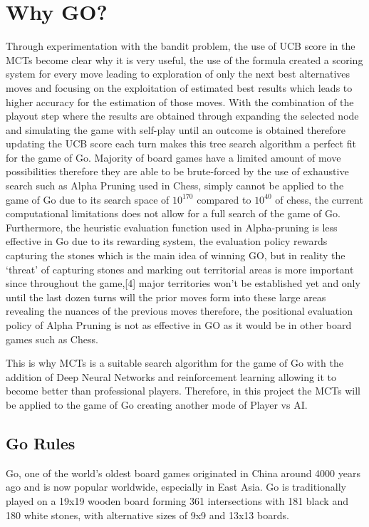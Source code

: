 \documentclass[]{final_report}
\begin{document}
\chapter{Why GO?}

Through experimentation with the bandit problem, the use of UCB score in the MCTs become clear why it is very useful, the use of the formula created a scoring system for every move leading to exploration of only the next best alternatives moves and focusing on the exploitation of estimated best results which leads to higher accuracy for the estimation of those moves. With the combination of the playout step where the results are obtained through expanding the selected node and simulating the game with self-play until an outcome is obtained therefore updating the UCB score each turn makes this tree search algorithm a perfect fit for the game of Go. Majority of board games have a limited amount of move possibilities therefore they are able to be brute-forced by the use of exhaustive search such as Alpha Pruning used in Chess, simply cannot be applied to the game of Go due to its search space of $10^{170}$ compared to $10^{40}$  of chess, the current computational limitations does not allow for a full search of the game of Go. Furthermore, the heuristic evaluation function used in Alpha-pruning is less effective in Go due to its rewarding system, the evaluation policy rewards capturing the stones which is the main idea of winning GO, but in reality the ‘threat’ of capturing stones and marking out territorial areas is more important since throughout the game,[4] major territories won’t be established yet and only until the last dozen turns will the prior moves form into these large areas revealing the nuances of the previous moves therefore, the positional evaluation policy of Alpha Pruning is not as effective in GO as it would be in other board games such as Chess.  

This is why MCTs is a suitable search algorithm for the game of Go with the addition of Deep Neural Networks and reinforcement learning allowing it to become better than professional players. Therefore, in this project the MCTs will be applied to the game of Go creating another mode of Player vs AI. 

\section{Go Rules}

Go, one of the world’s oldest board games originated in China around 4000 years ago and is now popular worldwide, especially in East Asia. Go is traditionally played on a 19x19 wooden board forming 361 intersections with 181 black and 180 white stones, with alternative sizes of 9x9 and 13x13 boards. 
\end{document}
